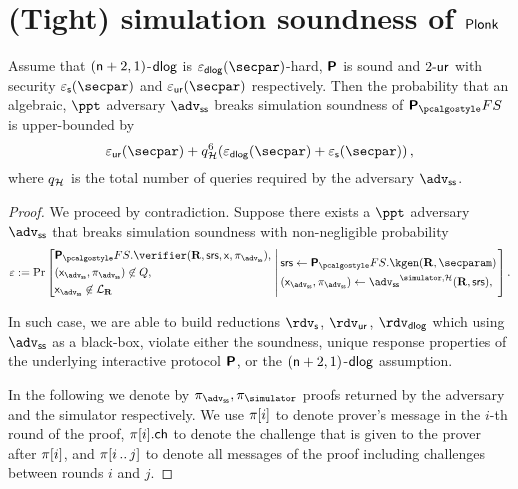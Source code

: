 \documentclass[runningheads,11pt]{llncs}
\theoremstyle{definition} \newtheorem{definition}[theorem]{Definition}
\begin{document}
\section{(Tight) simulation soundness of $\textnormal{\textsf{Plonk}}$}
\begin{theorem}
  Assume that $(\mathsf{n} + 2, 1)$-$\mathsf{dlog}$ is
  $\eps_\dlog(\secpar)$-hard, $\bm{\mathsf{P}}$ is sound and ${2\text{-}\mathsf{ur}}$ with security
  $\epss(\secpar)$ and $\epsur(\secpar)$ respectively. Then the probability that
  an algebraic, $\ppt$ adversary $\advss$ breaks simulation soundness of
  $\plonkprotfs$ is upper-bounded by
  \[
    \epsur(\secpar) + q_\ro^6 (\eps_{\dlog}(\secpar) + \epss(\secpar))\,,
  \]
  where $q_{\mathcal{H}}$ is the total number of queries required by the adversary
  $\advss$.
\end{theorem}
\begin{proof}
  We proceed by contradiction. Suppose there exists a $\ppt$ adversary $\advss$
  that breaks simulation soundness with non-negligible probability
  \[
    \eps := \Pr \left[
      \begin{aligned}
        & \plonkprotfs.\verifier(\REL, \srs, \inp, \zkproof_{\advss}),\\
        & (\inp_{\advss}, \zkproof_{\advss}) \not\in Q,\\
        & \inp_\advss \not\in \LANG_\REL
      \end{aligned}
      \,\left|\, \vphantom{\begin{aligned}
            & \plonkprotfs.\verifier(\REL, \srs, \inp, \zkproof_{\advss}),\\
            & (\inp_{\advss}, \zkproof_{\advss}) \not\in Q,\\
            & \inp_\advss \not\in \LANG_\REL
          \end{aligned}}
        \begin{aligned}
          & \srs \gets \plonkprotfs.\kgen(\REL, \secparam)\\
          & (\inp_{\advss}, \zkproof_{\advss}) \gets \advss^{\simulator, \ro}
          (\REL, \srs),
        \end{aligned}
      \right.\right].
  \]

  In such case, we are able to build reductions $\rdvs$, $\rdvur$, $\rdvdlog$
  which using $\advss$ as a black-box, violate either the soundness, unique
  response properties of the underlying interactive protocol $\bm{\mathsf{P}}$, or
  the $(\mathsf{n} + 2, 1)$-$\mathsf{dlog}$ assumption.

  In the following we denote by $\zkproof_{\advss}, \zkproof_{\simulator}$
  proofs returned by the adversary and the simulator respectively. We use
  $\pi[i]$ to denote prover's message in the $i$-th round of the proof,
  $\pi[i].\mathsf{ch}$ to denote the challenge that is given to the prover after
  $\pi[i]$, and $\pi[i \, .. \, j]$ to denote all messages of the proof
  including challenges between rounds $i$ and $j$.


\end{proof}
\end{document}
